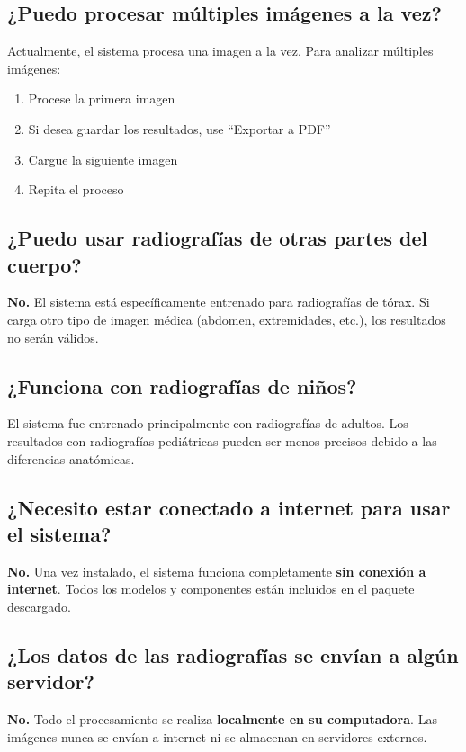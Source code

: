 \documentclass[12pt,a4paper]{article}
\begin{document}
\subsection{¿Puedo procesar múltiples imágenes a la vez?}

Actualmente, el sistema procesa una imagen a la vez. Para analizar múltiples imágenes:
\begin{enumerate}[leftmargin=*]
    \item Procese la primera imagen
    \item Si desea guardar los resultados, use ``Exportar a PDF''
    \item Cargue la siguiente imagen
    \item Repita el proceso
\end{enumerate}

\subsection{¿Puedo usar radiografías de otras partes del cuerpo?}

\textbf{No.} El sistema está específicamente entrenado para radiografías de tórax. Si carga otro tipo de imagen médica (abdomen, extremidades, etc.), los resultados no serán válidos.

\subsection{¿Funciona con radiografías de niños?}

El sistema fue entrenado principalmente con radiografías de adultos. Los resultados con radiografías pediátricas pueden ser menos precisos debido a las diferencias anatómicas.

\subsection{¿Necesito estar conectado a internet para usar el sistema?}

\textbf{No.} Una vez instalado, el sistema funciona completamente \textbf{sin conexión a internet}. Todos los modelos y componentes están incluidos en el paquete descargado.

\subsection{¿Los datos de las radiografías se envían a algún servidor?}

\textbf{No.} Todo el procesamiento se realiza \textbf{localmente en su computadora}. Las imágenes nunca se envían a internet ni se almacenan en servidores externos.
\end{document}

